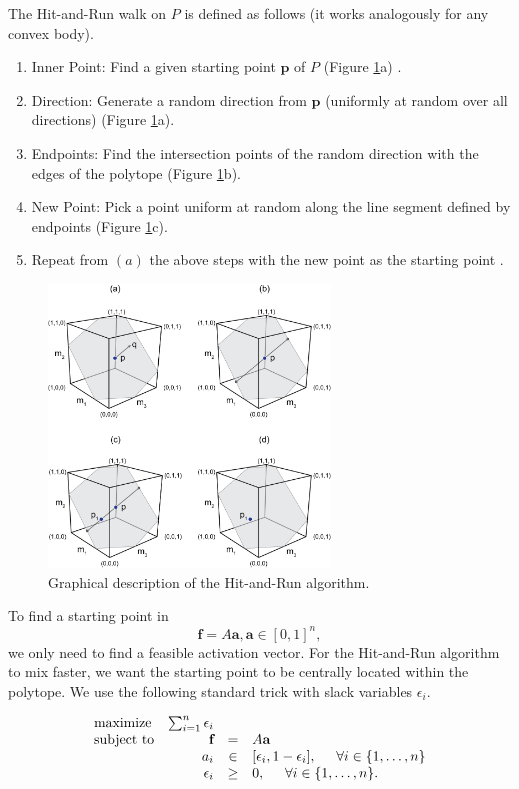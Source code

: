 The Hit-and-Run walk on $P$ is defined as follows (it works analogously for any convex body). 
\begin{enumerate}
\item Inner Point: Find a given starting point $\textbf{p}$ of $P$ (Figure \ref{fig:hitruncube}a) .
\item Direction: Generate a random direction from $\textbf{p}$ (uniformly at random over all directions) (Figure \ref{fig:hitruncube}a).
\item Endpoints: Find the intersection points of the random direction with the edges of the polytope (Figure \ref{fig:hitruncube}b).
\item New Point: Pick a point uniform at random along the line segment defined by endpoints (Figure \ref{fig:hitruncube}c). 
\item Repeat from $(a)$ the above steps with the new point as the starting point .
\end{enumerate}


\begin{figure}[htbp]
\centering
\includegraphics[width=7.5cm]{sections/figs/hitruncube.png}
\caption{Graphical description of the Hit-and-Run algorithm.}
\label{fig:hitruncube}
\end{figure}


To find a starting point in 
\[\textbf{f} = A\textbf{a}, \textbf{a} \in [0,1]^n,\]
we only need to find a feasible activation vector. For the Hit-and-Run algorithm to mix faster, we want the starting point to be centrally located within the polytope. We use the following standard trick with slack variables $\epsilon_i$.

\begin{equation}\label{eq:LP_r}
\begin{array}{lrcl}
\mbox{maximize} & \sum_{i=1}^n \epsilon_i \\ 
\mbox{subject to} & \textbf{f} &=& A\textbf{a}\\
  & a_i &\in& [\epsilon_i, 1- \epsilon_i], \hspace{5mm} \forall i \in \{1,\dots,n\}  \\
  & \epsilon_i &\geq& 0, \hspace{5mm} \forall i \in \{1,\dots,n\}.  
\end{array}
\end{equation}

